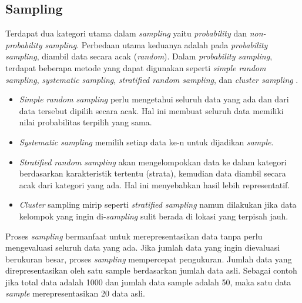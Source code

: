 \subsection{Sampling}
Terdapat dua kategori utama dalam \textit{sampling} yaitu \textit{probability} dan \textit{non-probability sampling}. Perbedaan utama keduanya adalah pada \textit{probability sampling}, diambil data secara acak (\textit{random}). Dalam \textit{probability sampling}, terdapat beberapa metode yang dapat digunakan seperti \textit{simple random sampling}, \textit{systematic sampling}, \textit{stratified random sampling}, dan \textit{cluster sampling} \citep{barreiro2001population}.
\begin{itemize}
  \item \textit{Simple random sampling} perlu mengetahui seluruh data yang ada dan dari data tersebut dipilih secara acak. Hal ini membuat seluruh data memiliki nilai probabilitas terpilih yang sama. 
  \item \textit{Systematic sampling} memilih setiap data ke-n untuk dijadikan \textit{sample}. 
  \item \textit{Stratified random sampling} akan mengelompokkan data ke dalam kategori berdasarkan karakteristik tertentu (strata), kemudian data diambil secara acak dari kategori yang ada. Hal ini menyebabkan hasil lebih representatif. 
  \item \textit{Cluster} sampling mirip seperti \textit{stratified sampling} namun dilakukan jika data kelompok yang ingin di-\textit{sampling} sulit berada di lokasi yang terpisah jauh.
\end{itemize}

Proses \textit{sampling} bermanfaat untuk merepresentasikan data tanpa perlu mengevaluasi seluruh data yang ada. Jika jumlah data yang ingin dievaluasi berukuran besar, proses \textit{sampling} mempercepat pengukuran. Jumlah data yang direpresentasikan oleh satu sample berdasarkan jumlah data asli. Sebagai contoh jika total data adalah 1000 dan jumlah data sample adalah 50, maka satu data \textit{sample} merepresentasikan 20 data asli.

